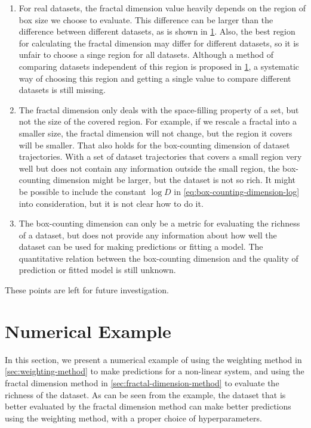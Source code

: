 \begin{enumerate}
    \item For real datasets, the fractal dimension value heavily depends on the region of box size we choose to evaluate.
    This difference can be larger than the difference between different datasets, as is shown in \cref{sec:non-linear-system-numerical-example}.
    Also, the best region for calculating the fractal dimension may differ for different datasets, so it is unfair to choose a singe region for all datasets.
    Although a method of comparing datasets independent of this region is proposed in \cref{sec:non-linear-system-numerical-example}, a systematic way of choosing this region and getting a single value to compare different datasets is still missing.
    \item The fractal dimension only deals with the space-filling property of a set, but not the size of the covered region.
    For example, if we rescale a fractal into a smaller size, the fractal dimension will not change, but the region it covers will be smaller.
    That also holds for the box-counting dimension of dataset trajectories.
    With a set of dataset trajectories that covers a small region very well but does not contain any information outside the small region, the box-counting dimension might be larger, but the dataset is not so rich.
    It might be possible to include the constant $\log D$ in \cref{eq:box-counting-dimension-log} into consideration, but it is not clear how to do it.
    \item The box-counting dimension can only be a metric for evaluating the richness of a dataset, but does not provide any information about how well the dataset can be used for making predictions or fitting a model.
    The quantitative relation between the box-counting dimension and the quality of prediction or fitted model is still unknown.
\end{enumerate}

These points are left for future investigation.


\section{Numerical Example}\label{sec:non-linear-system-numerical-example}

In this section, we present a numerical example of using the weighting method in \cref{sec:weighting-method} to make predictions for a non-linear system, and using the fractal dimension method in \cref{sec:fractal-dimension-method} to evaluate the richness of the dataset.
As can be seen from the example, the dataset that is better evaluated by the fractal dimension method can make better predictions using the weighting method, with a proper choice of hyperparameters.

